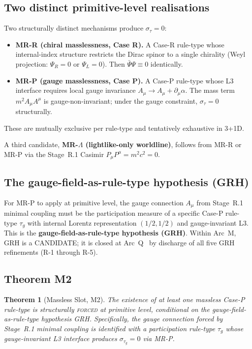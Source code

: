 \documentclass[11pt,a4paper]{article}
\newtheorem{theorem}{Theorem}[section]
\begin{document}
\subsection{Two distinct primitive-level realisations}

Two structurally distinct mechanisms produce $\sigma_\tau = 0$:
\begin{itemize}
  \item \textbf{MR-R (chiral masslessness, Case R).} A Case-R rule-type whose internal-index structure restricts the Dirac spinor to a single chirality (Weyl projection: $\Psi_R = 0$ or $\Psi_L = 0$). Then $\bar\Psi\Psi \equiv 0$ identically.
  \item \textbf{MR-P (gauge masslessness, Case P).} A Case-P rule-type whose L3 interface requires local gauge invariance $A_\mu \to A_\mu + \partial_\mu \alpha$. The mass term $m^2 A_\mu A^\mu$ is gauge-non-invariant; under the gauge constraint, $\sigma_\tau = 0$ structurally.
\end{itemize}
These are mutually exclusive per rule-type and tentatively exhaustive in 3+1D.

A third candidate, \textbf{MR-$\Lambda$ (lightlike-only worldline)}, follows from MR-R or MR-P via the Stage~R.1 Casimir $P_\mu P^\mu = m^2 c^2 = 0$.

\subsection{The gauge-field-as-rule-type hypothesis (GRH)}

For MR-P to apply at primitive level, the gauge connection $A_\mu$ from Stage~R.1 minimal coupling must be the participation measure of a specific Case-P rule-type $\tau_g$ with internal Lorentz representation $(1/2, 1/2)$ and gauge-invariant L3. This is the \textbf{gauge-field-as-rule-type hypothesis (GRH)}. Within Arc~M, GRH is a CANDIDATE; it is closed at Arc~Q~\cite{arcq} by discharge of all five GRH refinements (R-1 through R-5).

\subsection{Theorem M2}

\begin{theorem}[Massless Slot, M2]
The existence of at least one massless Case-P rule-type is structurally \textsc{forced} at primitive level, conditional on the gauge-field-as-rule-type hypothesis GRH. Specifically, the gauge connection forced by Stage~R.1 minimal coupling is identified with a participation rule-type $\tau_g$ whose gauge-invariant L3 interface produces $\sigma_{\tau_g} = 0$ via MR-P.
\end{theorem}
\end{document}
